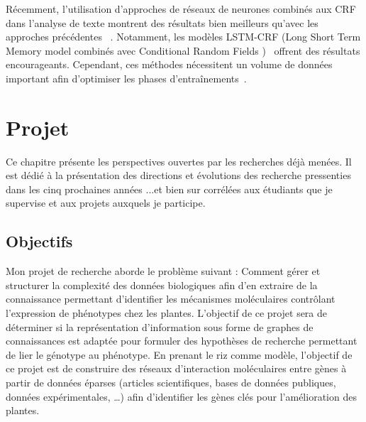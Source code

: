 Récemment, l'utilisation d'approches de réseaux de neurones combinés aux CRF dans l'analyse de texte montrent des résultats bien meilleurs qu'avec les approches précédentes ~\cite{Segura-Bedmar2015}. Notamment, les modèles LSTM-CRF (Long Short Term Memory model combinés avec Conditional Random Fields )~\cite{Lample2016} offrent des résultats encourageants. Cependant, ces méthodes nécessitent un volume de données important afin d'optimiser les phases d'entraînements~\cite{Habibi2017a}. \\
 

\chapter{Projet}

Ce chapitre présente les perspectives ouvertes par les recherches déjà menées. Il est dédié à la présentation des directions et évolutions des recherche pressenties dans les cinq prochaines années ...et bien sur corrélées aux étudiants que je supervise et aux projets auxquels je participe.

\section{Objectifs}
\label{Objectifs}



Mon projet de recherche aborde le problème suivant : Comment gérer et structurer la complexité des données biologiques afin d’en extraire de la connaissance permettant d’identifier les mécanismes moléculaires contrôlant l’expression de phénotypes chez les plantes. 
L’objectif de ce projet sera de déterminer si la représentation d’information sous forme de graphes de connaissances est adaptée pour formuler des hypothèses de recherche permettant de lier le génotype au phénotype. En prenant le riz comme modèle, l’objectif de ce projet est de construire des réseaux d’interaction moléculaires entre gènes à partir de données éparses (articles scientifiques, bases de données publiques, données expérimentales, …) afin d’identifier les gènes clés pour l’amélioration des plantes.\\

